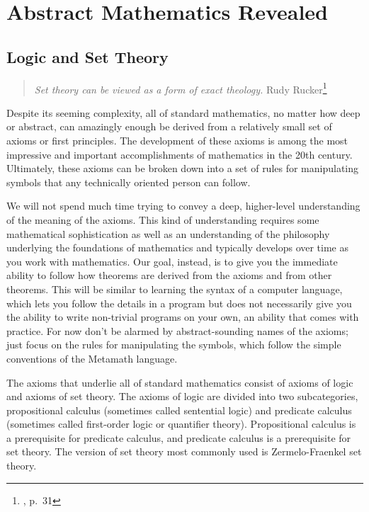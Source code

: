 \chapter{Abstract Mathematics Revealed}\label{fol}

\section{Logic and Set Theory}\label{logicandsettheory}

\begin{quote}
  {\em Set theory can be viewed as a form of exact theology.}
  \flushright\sc  Rudy Rucker\footnote{\cite{Barrow}, p.~31}\\
\end{quote}

Despite its seeming complexity, all of standard mathematics, no matter how
deep or abstract, can amazingly enough be derived from a relatively small set
of axioms or first principles. The development of these axioms is
among the most impressive and important accomplishments of mathematics in the
20th century. Ultimately, these axioms can be broken down into a set of rules
for manipulating symbols that any technically oriented person can follow.

We will not spend much time trying to convey a deep, higher-level
understanding of the meaning of the axioms. This kind of understanding
requires some mathematical sophistication as well as an understanding of the
philosophy underlying the foundations of mathematics and typically develops
over time as you work with mathematics.  Our goal, instead, is to give you the
immediate ability to follow how theorems are derived from the
axioms and from other theorems.  This will be similar to learning the syntax
of a computer language, which lets you follow the details in a program but
does not necessarily give you the ability to write non-trivial programs on
your own, an ability that comes with practice. For now don't be alarmed by
abstract-sounding names of the axioms; just focus on the rules for
manipulating the symbols, which follow the simple conventions of the
Metamath language.

The axioms that underlie all of standard mathematics consist of axioms of logic
and axioms of set theory. The axioms of logic are divided into two
subcategories, propositional calculus (sometimes
called sentential logic) and predicate calculus
(sometimes called first-order logic or quantifier theory).  Propositional
calculus is a prerequisite for predicate calculus, and predicate calculus is a
prerequisite for set theory.  The version of set theory most commonly used is
Zermelo-Fraenkel set theory.

